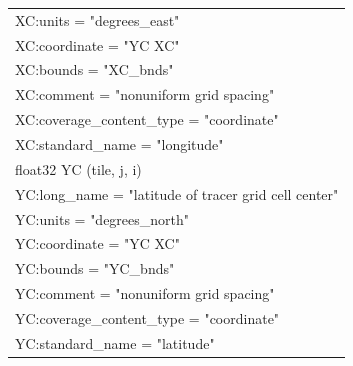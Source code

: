 \begin{longtable}{|p{\textwidth}|}
\rowcolor{Apricot}\hspace{0.5cm}\hspace{0.5cm}XC:units = "degrees\_east"\\
\rowcolor{Apricot}\hspace{0.5cm}\hspace{0.5cm}XC:coordinate = "YC XC"\\
\rowcolor{Apricot}\hspace{0.5cm}\hspace{0.5cm}XC:bounds = "XC\_bnds"\\
\rowcolor{Apricot}\hspace{0.5cm}\hspace{0.5cm}XC:comment = "nonuniform grid spacing"\\
\rowcolor{Apricot}\hspace{0.5cm}\hspace{0.5cm}XC:coverage\_content\_type = "coordinate"\\
\rowcolor{Apricot}\hspace{0.5cm}\hspace{0.5cm}XC:standard\_name = "longitude"\\
\rowcolor{Apricot}\hspace{0.5cm}float32 YC (tile, j, i)\\
\rowcolor{Apricot}\hspace{0.5cm}\hspace{0.5cm}YC:long\_name = "latitude of tracer grid cell center"\\
\rowcolor{Apricot}\hspace{0.5cm}\hspace{0.5cm}YC:units = "degrees\_north"\\
\rowcolor{Apricot}\hspace{0.5cm}\hspace{0.5cm}YC:coordinate = "YC XC"\\
\rowcolor{Apricot}\hspace{0.5cm}\hspace{0.5cm}YC:bounds = "YC\_bnds"\\
\rowcolor{Apricot}\hspace{0.5cm}\hspace{0.5cm}YC:comment = "nonuniform grid spacing"\\
\rowcolor{Apricot}\hspace{0.5cm}\hspace{0.5cm}YC:coverage\_content\_type = "coordinate"\\
\rowcolor{Apricot}\hspace{0.5cm}\hspace{0.5cm}YC:standard\_name = "latitude"\\

\end{longtable}
